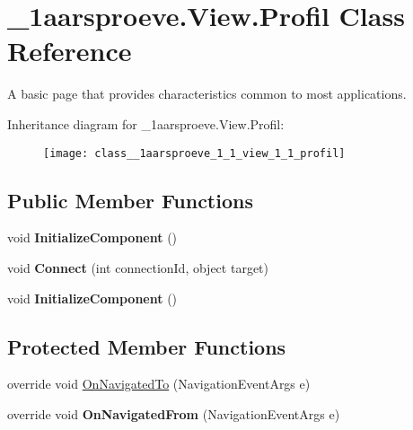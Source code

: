 \hypertarget{class__1aarsproeve_1_1_view_1_1_profil}{}\section{\+\_\+1aarsproeve.\+View.\+Profil Class Reference}
\label{class__1aarsproeve_1_1_view_1_1_profil}


A basic page that provides characteristics common to most applications.  


Inheritance diagram for \+\_\+1aarsproeve.\+View.\+Profil\+:\begin{figure}[H]
\begin{center}
\leavevmode
\texttt{[image: class\_\_1aarsproeve\_1\_1\_view\_1\_1\_profil]}
\end{center}
\end{figure}
\subsection*{Public Member Functions}
\begin{DoxyCompactItemize}
\item 
\hypertarget{class__1aarsproeve_1_1_view_1_1_profil_a8a49f31d1274ad9f3d7dda340180166b}{}void {\bfseries Initialize\+Component} ()\label{class__1aarsproeve_1_1_view_1_1_profil_a8a49f31d1274ad9f3d7dda340180166b}

\item 
\hypertarget{class__1aarsproeve_1_1_view_1_1_profil_aef76942d2b54a5a91a00c1da9e18fed0}{}void {\bfseries Connect} (int connection\+Id, object target)\label{class__1aarsproeve_1_1_view_1_1_profil_aef76942d2b54a5a91a00c1da9e18fed0}

\item 
\hypertarget{class__1aarsproeve_1_1_view_1_1_profil_a8a49f31d1274ad9f3d7dda340180166b}{}void {\bfseries Initialize\+Component} ()\label{class__1aarsproeve_1_1_view_1_1_profil_a8a49f31d1274ad9f3d7dda340180166b}

\end{DoxyCompactItemize}
\subsection*{Protected Member Functions}
\begin{DoxyCompactItemize}
\item 
override void \hyperlink{class__1aarsproeve_1_1_view_1_1_profil_ab9fe2415e3f9fab8b95a4d10f374b8dd}{On\+Navigated\+To} (Navigation\+Event\+Args e)
\item 
\hypertarget{class__1aarsproeve_1_1_view_1_1_profil_a0104213a42510d9bad8143e22947a0b6}{}override void {\bfseries On\+Navigated\+From} (Navigation\+Event\+Args e)\label{class__1aarsproeve_1_1_view_1_1_profil_a0104213a42510d9bad8143e22947a0b6}

\end{DoxyCompactItemize}
